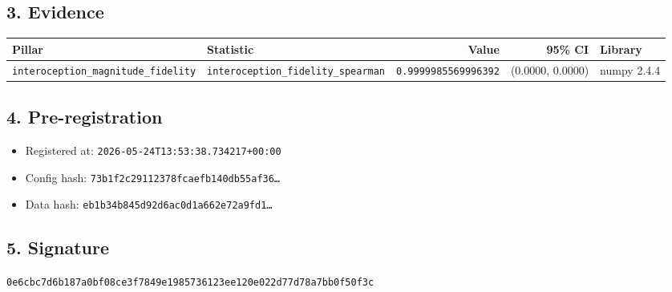 \documentclass{article}
\begin{document}
\subsection*{3. Evidence}
\begin{tabular}{llrrl}\toprule
\textbf{Pillar} & \textbf{Statistic} & \textbf{Value} & \textbf{95\% CI} & \textbf{Library} \\\midrule
\texttt{interoception\_magnitude\_fidelity} & \texttt{interoception\_fidelity\_spearman} & \texttt{0.9999985569996392} & (0.0000, 0.0000) & numpy 2.4.4 \\
\bottomrule\end{tabular}
\subsection*{4. Pre-registration}
\begin{itemize}
\item Registered at: \texttt{2026-05-24T13:53:38.734217+00:00}
\item Config hash: \texttt{73b1f2c29112378fcaefb140db55af36\dots}
\item Data hash: \texttt{eb1b34b845d92d6ac0d1a662e72a9fd1\dots}
\end{itemize}
\subsection*{5. Signature}
\texttt{0e6cbc7d6b187a0bf08ce3f7849e1985736123ee120e022d77d78a7bb0f50f3c}\\
\end{document}
